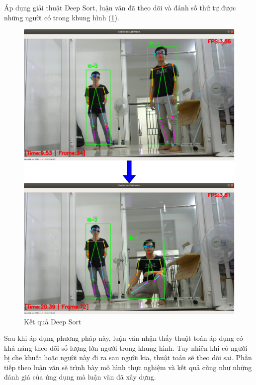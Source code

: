 Áp dụng giải thuật Deep Sort, luận văn đã theo dõi và đánh số thứ tự được những người có trong khung hình (\ref{fig:deep_sort}).
\FloatBarrier
\begin{figure}[htp]
\begin{center}
\includegraphics[scale=0.8]{chap5/c5_figs/deep_sort.png}
\end{center}
\caption{Kết quả Deep Sort}
\label{fig:deep_sort}
\end{figure}
\FloatBarrier

Sau khi áp dụng phương pháp này, luận văn nhận thấy thuật toán áp dụng có khả năng theo dõi số lượng lớn người trong khung hình. Tuy nhiên khi có người bị che khuất hoặc người này đi ra sau người kia, thuật toán sẽ theo dõi sai. Phần tiếp theo luận văn sẽ trình bày mô hình thực nghiệm và kết quả cũng như những đánh giá của ứng dụng mà luận văn đã xây dựng.
